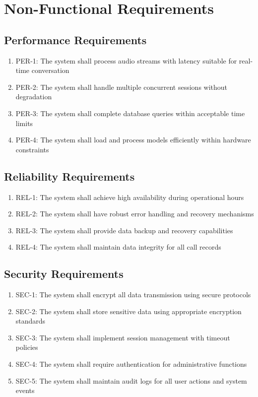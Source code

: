 \section{Non-Functional Requirements}

\subsection{Performance Requirements}
\begin{enumerate}
    \item PER-1: The system shall process audio streams with latency suitable for real-time conversation
    \item PER-2: The system shall handle multiple concurrent sessions without degradation
    \item PER-3: The system shall complete database queries within acceptable time limits
    \item PER-4: The system shall load and process models efficiently within hardware constraints
\end{enumerate}

\subsection{Reliability Requirements}
\begin{enumerate}
    \item REL-1: The system shall achieve high availability during operational hours
    \item REL-2: The system shall have robust error handling and recovery mechanisms
    \item REL-3: The system shall provide data backup and recovery capabilities
    \item REL-4: The system shall maintain data integrity for all call records
\end{enumerate}

\subsection{Security Requirements}
\begin{enumerate}
    \item SEC-1: The system shall encrypt all data transmission using secure protocols
    \item SEC-2: The system shall store sensitive data using appropriate encryption standards
    \item SEC-3: The system shall implement session management with timeout policies
    \item SEC-4: The system shall require authentication for administrative functions
    \item SEC-5: The system shall maintain audit logs for all user actions and system events
\end{enumerate}

